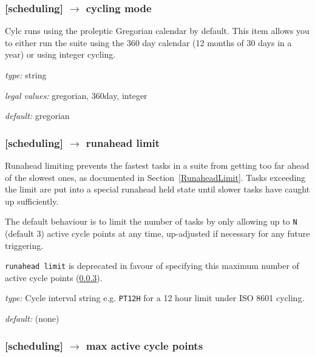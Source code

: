 \subsubsection[cycling]{ [scheduling] $\rightarrow$ cycling mode }
\label{cycling-mode}

Cylc runs using the proleptic Gregorian calendar by default. This item allows
you to either run the suite using the 360 day calendar (12 months of 30 days 
in a year) or using integer cycling.

\begin{myitemize}
    \item {\em type:} string
    \item {\em legal values:} gregorian, 360day, integer
    \item {\em default:} gregorian
    
\end{myitemize}


\subsubsection[runahead limit]{[scheduling] $\rightarrow$ runahead limit}
\label{runahead limit}

Runahead limiting prevents the fastest tasks in a suite from
getting too far ahead of the slowest ones, as documented in
Section~\ref{RunaheadLimit}. Tasks exceeding the limit are put into
a special runahead held state until slower tasks have caught up
sufficiently.

The default behaviour is to limit the number of tasks
by only allowing up to \lstinline=N= (default 3) active cycle points at
any time, up-adjusted if necessary for any future triggering.

\lstinline=runahead limit= is deprecated in favour of specifying this
maximum number of active cycle points (\ref{max active cycle points}).

\begin{myitemize}
    \item {\em type:} Cycle interval string e.g. \lstinline=PT12H=
    for a 12 hour limit under ISO 8601 cycling.
    \item {\em default:} (none)
\end{myitemize}


\subsubsection[max active cycle points]{[scheduling] $\rightarrow$
 max active cycle points}
\label{max active cycle points}

